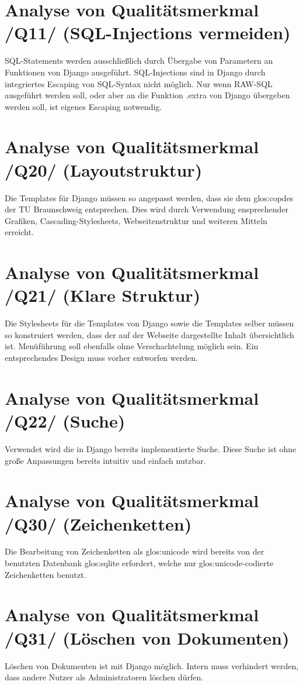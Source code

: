 \section{Analyse von Qualitätsmerkmal /Q11/ (SQL-Injections vermeiden)}

SQL-Statements werden ausschließlich durch Übergabe von Parametern an 
Funktionen von Django ausgeführt. SQL-Injections sind in Django durch 
integriertes Escaping von SQL-Syntax nicht möglich. Nur wenn RAW-SQL 
ausgeführt werden soll, oder aber an die Funktion .extra von Django 
übergeben werden soll, ist eigenes Escaping notwendig.

\section{Analyse von Qualitätsmerkmal /Q20/ (Layoutstruktur)}

Die Templates für Django müssen so angepasst werden, dass sie dem
\Gls{glos:copdes}  der TU Braunschweig entsprechen. Dies wird durch Verwendung
ensprechender Grafiken, Cascading-Stylesheets, Webseitenstruktur und weiteren
Mitteln erreicht.


\section{Analyse von Qualitätsmerkmal /Q21/ (Klare Struktur)}

Die Stylesheets für die Templates von Django sowie die Templates selber
müssen so konstruiert werden, dass der auf der Webseite dargestellte 
Inhalt übersichtlich ist. Menüführung soll ebenfalls ohne Verschachtelung
möglich sein. Ein entsprechendes Design muss vorher entworfen werden.


\section{Analyse von Qualitätsmerkmal /Q22/ (Suche)}

Verwendet wird die in Django bereits implementierte Suche. Diese Suche ist ohne
große Anpassungen bereits intuitiv und einfach nutzbar.


\section{Analyse von Qualitätsmerkmal /Q30/ (Zeichenketten)} 

Die Bearbeitung von Zeichenketten als \Gls{glos:unicode} wird bereits von der benutzten
Datenbank \Gls{glos:sqlite} erfordert, welche nur \Gls{glos:unicode}-codierte Zeichenketten benutzt.


\section{Analyse von Qualitätsmerkmal /Q31/ (Löschen von Dokumenten)} 

Löschen von Dokumenten ist mit Django möglich. Intern muss verhindert werden,
dass andere Nutzer als Administratoren löschen dürfen.
